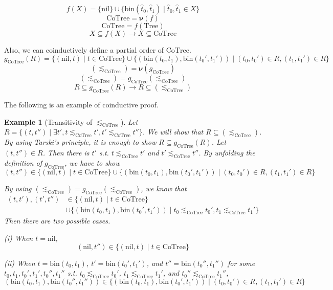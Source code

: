 \documentclass{article}
\newtheorem{example}[theorem]{Example}
\newcommand\Tree[0]{\text{Tree}}
\newcommand\CoTree[0]{\text{CoTree}}
\newcommand\nil[0]{\text{nil}}
\newcommand\bin[0]{\text{bin}}
\newcommand\cofix[0]{\boldsymbol{\nu}}
\begin{document}
  $$ f(X) = \{\nil\} \cup \{\bin(\hat t_0, \hat t_1) \mid \hat t_0, \hat t_1 \in X\} $$
  $$ \CoTree = \cofix(f) $$
  $$ \CoTree = f(\Tree) $$
  $$ X \subseteq f(X) \to X \subseteq \CoTree $$

  Also, we can coinductively define a partial order of $\CoTree$.
  $$ g_{\CoTree}(R) =
    \{(\nil,t) \mid t \in \CoTree\} \cup
    \{(\bin(t_0, t_1), \bin(t_0', t_1')) \mid (t_0, t_0') \in R, (t_1, t_1') \in R \}
  $$
  $$ (\lesssim_{\CoTree}) = \cofix(g_{\CoTree}) $$
  $$ (\lesssim_{\CoTree}) = g_{\CoTree}(\lesssim_{\CoTree}) $$
  $$ R \subseteq g_{\CoTree}(R) \to R \subseteq (\lesssim_{\CoTree}) $$

  The following is an example of coinductive proof.
  \begin{example}[Transitivity of $\lesssim_{\CoTree}$]
    Let $R = \{(t, t'') \mid \exists t', t \lesssim_\CoTree t', t' \lesssim_\CoTree t''\}$.
    We will show that $R \subseteq (\lesssim_\CoTree)$.
    By using Tarski's principle, it is enough to show $R \subseteq g_\CoTree(R)$.
    Let $(t, t'') \in R$. Then there is $t'$ s.t. $t \lesssim_\CoTree t'$ and $t' \lesssim_\CoTree t''$.
    By unfolding the definition of $g_\CoTree$,
    we have to show
    $$ (t, t'') \in
       \{(\nil,t) \mid t \in \CoTree\} \cup
       \{(\bin(t_0, t_1), \bin(t_0', t_1')) \mid (t_0, t_0') \in R, (t_1, t_1') \in R \}
    $$

    By using $(\lesssim_\CoTree) = g_\CoTree(\lesssim_\CoTree)$, we know that
    $$
      \begin{aligned}
        (t,t'), (t', t'')
        & \in \{(\nil,t) \mid t \in \CoTree\} \\
        & \cup \{(\bin(t_0, t_1), \bin(t_0', t_1')) \mid t_0 \lesssim_\CoTree t_0', t_1 \lesssim_\CoTree t_1' \}
      \end{aligned}
    $$
    Then there are two possible cases.

    (i) When $t = \nil$,
        $$(\nil, t'') \in \{(\nil,t) \mid t \in \CoTree\}$$

    (ii) When $t = \bin(t_0, t_1)$, $t' = \bin(t_0', t_1')$, and $t'' = \bin(t_0'', t_1'')$ for some $t_0, t_1, t_0', t_1', t_0'', t_1''$ s.t.
          $t_0 \lesssim_\CoTree t_0'$, $t_1 \lesssim_\CoTree t_1'$, and $t_0'' \lesssim_\CoTree t_1''$,
        $$ (\bin(t_0, t_1), \bin(t_0'', t_1'')) \in
           \{(\bin(t_0, t_1), \bin(t_0', t_1')) \mid (t_0, t_0') \in R, (t_1, t_1') \in R \}
        $$
  \end{example}
\end{document}
